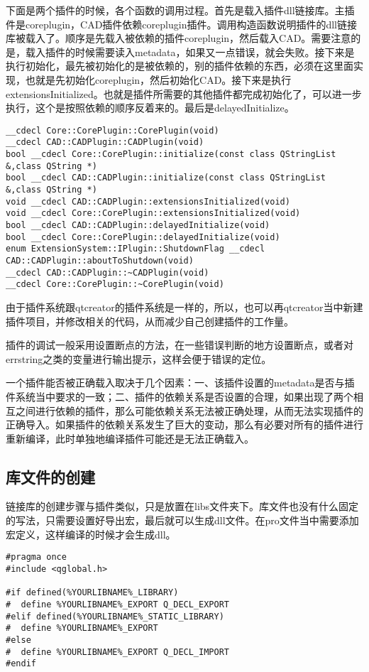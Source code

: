 下面是两个插件的时候，各个函数的调用过程。首先是载入插件dll链接库。主插件是coreplugin，CAD插件依赖coreplugin插件。调用构造函数说明插件的dll链接库被载入了。顺序是先载入被依赖的插件coreplugin，然后载入CAD。需要注意的是，载入插件的时候需要读入metadata，如果又一点错误，就会失败。接下来是执行初始化，最先被初始化的是被依赖的，别的插件依赖的东西，必须在这里面实现，也就是先初始化coreplugin，然后初始化CAD。接下来是执行extensionsInitialized。也就是插件所需要的其他插件都完成初始化了，可以进一步执行，这个是按照依赖的顺序反着来的。最后是delayedInitialize。
\begin{lstlisting}
__cdecl Core::CorePlugin::CorePlugin(void)
__cdecl CAD::CADPlugin::CADPlugin(void)
bool __cdecl Core::CorePlugin::initialize(const class QStringList &,class QString *)
bool __cdecl CAD::CADPlugin::initialize(const class QStringList &,class QString *)
void __cdecl CAD::CADPlugin::extensionsInitialized(void)
void __cdecl Core::CorePlugin::extensionsInitialized(void)
bool __cdecl CAD::CADPlugin::delayedInitialize(void)
bool __cdecl Core::CorePlugin::delayedInitialize(void)    
enum ExtensionSystem::IPlugin::ShutdownFlag __cdecl CAD::CADPlugin::aboutToShutdown(void)
__cdecl CAD::CADPlugin::~CADPlugin(void)
__cdecl Core::CorePlugin::~CorePlugin(void)
\end{lstlisting}

由于插件系统跟qtcreator的插件系统是一样的，所以，也可以再qtcreator当中新建插件项目，并修改相关的代码，从而减少自己创建插件的工作量。

插件的调试一般采用设置断点的方法，在一些错误判断的地方设置断点，或者对errstring之类的变量进行输出提示，这样会便于错误的定位。

一个插件能否被正确载入取决于几个因素：一、该插件设置的metadata是否与插件系统当中要求的一致；二、插件的依赖关系是否设置的合理，如果出现了两个相互之间进行依赖的插件，那么可能依赖关系无法被正确处理，从而无法实现插件的正确导入。如果插件的依赖关系发生了巨大的变动，那么有必要对所有的插件进行重新编译，此时单独地编译插件可能还是无法正确载入。
\subsection{库文件的创建}
链接库的创建步骤与插件类似，只是放置在libs文件夹下。库文件也没有什么固定的写法，只需要设置好导出宏，最后就可以生成dll文件。在pro文件当中需要添加宏定义，这样编译的时候才会生成dll。
\begin{lstlisting}
#pragma once
#include <qglobal.h>

#if defined(%YOURLIBNAME%_LIBRARY)
#  define %YOURLIBNAME%_EXPORT Q_DECL_EXPORT
#elif defined(%YOURLIBNAME%_STATIC_LIBRARY)
#  define %YOURLIBNAME%_EXPORT
#else
#  define %YOURLIBNAME%_EXPORT Q_DECL_IMPORT
#endif
\end{lstlisting}